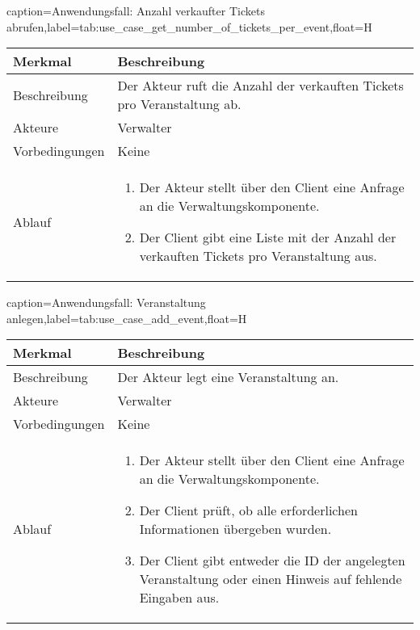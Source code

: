 \begin{dhbwtable}{caption={Anwendungsfall: Anzahl verkaufter Tickets abrufen},label=tab:use_case_get_number_of_tickets_per_event,float=H}
    \begin{tabularx}{\textwidth}{lX}
        \toprule
        \textbf{Merkmal} & \textbf{Beschreibung}  \\ \midrule
        Beschreibung    & Der Akteur ruft die Anzahl der verkauften Tickets pro Veranstaltung ab. \\
        Akteure         & Verwalter \\
        Vorbedingungen  & Keine \\
        Ablauf          & \begin{minipage}[t]{\linewidth}
        \vspace*{-3mm}
        \begin{enumerate}[leftmargin=*,nosep,after=\strut]
            \item Der Akteur stellt über den Client eine Anfrage an die Verwaltungskomponente.
            \item Der Client gibt eine Liste mit der Anzahl der verkauften Tickets pro Veranstaltung aus.
        \end{enumerate}
        \end{minipage} \\\bottomrule
    \end{tabularx}    
\end{dhbwtable}

\begin{dhbwtable}{caption={Anwendungsfall: Veranstaltung anlegen},label=tab:use_case_add_event,float=H}
    \begin{tabularx}{\textwidth}{lX}
        \toprule
        \textbf{Merkmal} & \textbf{Beschreibung}  \\ \midrule
        Beschreibung    & Der Akteur legt eine Veranstaltung an. \\
        Akteure         & Verwalter \\
        Vorbedingungen  & Keine \\
        Ablauf          & \begin{minipage}[t]{\linewidth}
        \vspace*{-3mm}
        \begin{enumerate}[leftmargin=*,nosep,after=\strut]
            \item Der Akteur stellt über den Client eine Anfrage an die Verwaltungskomponente.
            \item Der Client prüft, ob alle erforderlichen Informationen übergeben wurden.
            \item Der Client gibt entweder die ID der angelegten Veranstaltung oder einen Hinweis auf fehlende Eingaben aus.
        \end{enumerate}
        \end{minipage} \\\bottomrule
    \end{tabularx}    
\end{dhbwtable}
